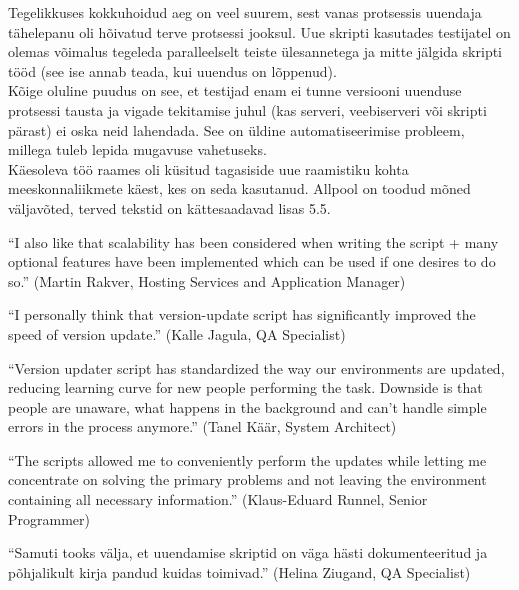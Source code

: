 \documentclass[12pt]{report}
\begin{document}
  Tegelikkuses kokkuhoidud aeg on veel suurem, sest vanas protsessis uuendaja tähelepanu oli hõivatud terve protsessi jooksul. Uue skripti kasutades testijatel on olemas võimalus tegeleda paralleelselt teiste ülesannetega ja mitte jälgida skripti tööd (see ise annab teada, kui uuendus on lõppenud).\\
  
  Kõige oluline puudus on see, et testijad enam ei tunne versiooni uuenduse protsessi tausta ja vigade tekitamise juhul (kas serveri, veebiserveri või skripti pärast) ei oska neid lahendada. See on üldine automatiseerimise probleem, millega tuleb lepida mugavuse vahetuseks.\\
  
   Käesoleva töö raames oli küsitud tagasiside uue raamistiku kohta meeskonnaliikmete käest, kes on seda kasutanud. Allpool on toodud mõned väljavõted, terved tekstid on kättesaadavad lisas 5.5.
   
   \begin{displayquote}
   ``I also like that scalability has been considered when writing the script + many optional features have been implemented which can be used if one desires to do so.'' (Martin Rakver, Hosting Services and Application Manager)
   \end{displayquote}
   
   \begin{displayquote}
   ``I personally think that version-update script has significantly improved the speed of version update.'' (Kalle Jagula, QA Specialist)
   \end{displayquote}
   
   \begin{displayquote}
    ``Version updater script has standardized the way our environments are updated, reducing learning curve for new people performing the task. Downside is that people are unaware, what happens in the background and can't handle simple errors in the process anymore.'' (Tanel Käär, System Architect)
    \end{displayquote}
    
    \begin{displayquote}
    ``The scripts allowed me to conveniently perform the updates while letting me concentrate on solving the primary problems and not leaving the environment containing all necessary information.'' (Klaus-Eduard Runnel, Senior Programmer)
    \end{displayquote}
    
    \begin{displayquote}
    ``Samuti tooks välja, et uuendamise skriptid on väga hästi dokumenteeritud ja põhjalikult kirja pandud kuidas toimivad.'' (Helina Ziugand, QA Specialist)
    \end{displayquote}
\end{document}
